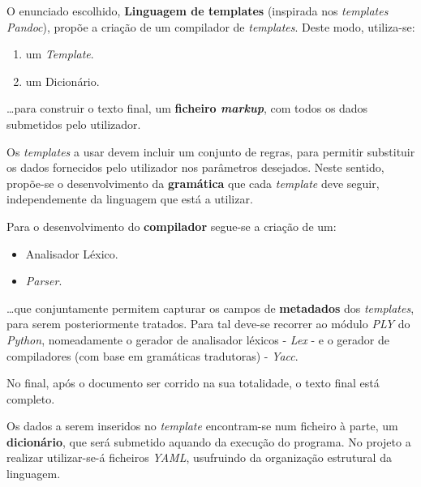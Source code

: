 \documentclass[../relatorio.tex]{subfiles}
\begin{document}
O enunciado escolhido, \textbf{Linguagem de templates} 
(inspirada nos \textit{templates Pandoc}),
propõe a criação de um compilador de \textit{templates}.
Deste modo, utiliza-se:
\begin{enumerate}
    \item um \textit{Template}.
    \item um Dicionário.
\end{enumerate}
\dots para construir o texto final, um \textbf{ficheiro \textit{markup}}, 
com todos os dados submetidos pelo utilizador.  

Os \textit{templates} a usar
devem incluir um conjunto de regras, para permitir 
substituir os dados fornecidos pelo utilizador 
nos parâmetros desejados. 
Neste sentido, propõe-se o desenvolvimento da \textbf{gramática}
que cada \textit{template} deve seguir, 
independemente da linguagem que está a utilizar.

Para o desenvolvimento do \textbf{compilador} segue-se a criação de um:
\begin{itemize}
    \item Analisador Léxico. 
    \item \textit{Parser}.
\end{itemize}
\dots que conjuntamente permitem capturar os campos de 
\textbf{metadados} dos \textit{templates}, para serem 
posteriormente tratados.
Para tal deve-se recorrer ao módulo \textit{PLY} do \textit{Python},
nomeadamente o gerador de analisador léxicos - \textit{Lex} - e
o gerador de compiladores (com base em gramáticas tradutoras) - \textit{Yacc}.

No final, após o documento ser corrido na sua totalidade,
o texto final está completo.

Os dados a serem inseridos no \textit{template}
encontram-se num ficheiro à parte, um \textbf{dicionário},
que será submetido aquando da execução do programa. 
No projeto a realizar utilizar-se-á ficheiros 
\textit{YAML}, usufruindo da organização 
estrutural da linguagem.
\end{document}
